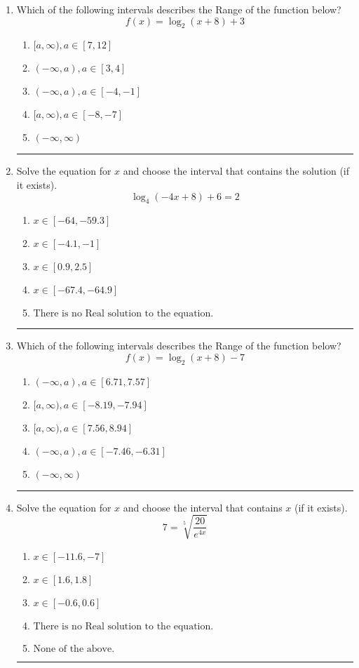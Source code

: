 \documentclass[14pt]{extbook}
\newcommand{\litem}[1]{\item#1\hspace*{-1cm}\rule{\textwidth}{0.4pt}}
\begin{document}
\begin{enumerate}
\litem{
Which of the following intervals describes the Range of the function below?\[ f(x) = \log_2{(x+8)}+3 \]\begin{enumerate}[label=\Alph*.]
\item \( [a, \infty), a \in [7, 12] \)
\item \( (-\infty, a), a \in [3, 4] \)
\item \( (-\infty, a), a \in [-4, -1] \)
\item \( [a, \infty), a \in [-8, -7] \)
\item \( (-\infty, \infty) \)

\end{enumerate} }
\litem{
Solve the equation for $x$ and choose the interval that contains the solution (if it exists).\[ \log_{4}{(-4x+8)}+6 = 2 \]\begin{enumerate}[label=\Alph*.]
\item \( x \in [-64, -59.3] \)
\item \( x \in [-4.1, -1] \)
\item \( x \in [0.9, 2.5] \)
\item \( x \in [-67.4, -64.9] \)
\item \( \text{There is no Real solution to the equation.} \)

\end{enumerate} }
\litem{
Which of the following intervals describes the Range of the function below?\[ f(x) = \log_2{(x+8)}-7 \]\begin{enumerate}[label=\Alph*.]
\item \( (-\infty, a), a \in [6.71, 7.57] \)
\item \( [a, \infty), a \in [-8.19, -7.94] \)
\item \( [a, \infty), a \in [7.56, 8.94] \)
\item \( (-\infty, a), a \in [-7.46, -6.31] \)
\item \( (-\infty, \infty) \)

\end{enumerate} }
\litem{
 Solve the equation for $x$ and choose the interval that contains $x$ (if it exists).\[  7 = \sqrt[5]{\frac{20}{e^{4x}}} \]\begin{enumerate}[label=\Alph*.]
\item \( x \in [-11.6, -7] \)
\item \( x \in [1.6, 1.8] \)
\item \( x \in [-0.6, 0.6] \)
\item \( \text{There is no Real solution to the equation.} \)
\item \( \text{None of the above.} \)


\end{enumerate}}
\end{enumerate}
\end{document}
